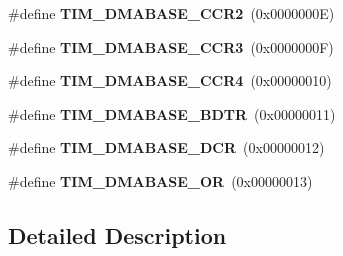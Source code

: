 \begin{DoxyCompactItemize}
\item 
\#define {\bfseries T\+I\+M\+\_\+\+D\+M\+A\+B\+A\+S\+E\+\_\+\+C\+C\+R2}~(0x0000000\+E)\hypertarget{group___t_i_m___d_m_a___base__address_ga0c73e7e1fa212ab14a43ca49e9d8850e}{}\label{group___t_i_m___d_m_a___base__address_ga0c73e7e1fa212ab14a43ca49e9d8850e}

\item 
\#define {\bfseries T\+I\+M\+\_\+\+D\+M\+A\+B\+A\+S\+E\+\_\+\+C\+C\+R3}~(0x0000000\+F)\hypertarget{group___t_i_m___d_m_a___base__address_gae3c259f405c78e31411c19195eac48bc}{}\label{group___t_i_m___d_m_a___base__address_gae3c259f405c78e31411c19195eac48bc}

\item 
\#define {\bfseries T\+I\+M\+\_\+\+D\+M\+A\+B\+A\+S\+E\+\_\+\+C\+C\+R4}~(0x00000010)\hypertarget{group___t_i_m___d_m_a___base__address_gaea24fd3f528163da065cbdce3c68ef23}{}\label{group___t_i_m___d_m_a___base__address_gaea24fd3f528163da065cbdce3c68ef23}

\item 
\#define {\bfseries T\+I\+M\+\_\+\+D\+M\+A\+B\+A\+S\+E\+\_\+\+B\+D\+TR}~(0x00000011)\hypertarget{group___t_i_m___d_m_a___base__address_ga767eab033d485d32de80b46f70be3341}{}\label{group___t_i_m___d_m_a___base__address_ga767eab033d485d32de80b46f70be3341}

\item 
\#define {\bfseries T\+I\+M\+\_\+\+D\+M\+A\+B\+A\+S\+E\+\_\+\+D\+CR}~(0x00000012)\hypertarget{group___t_i_m___d_m_a___base__address_gab3e5aaf0cb815b4a2469d3046eca0201}{}\label{group___t_i_m___d_m_a___base__address_gab3e5aaf0cb815b4a2469d3046eca0201}

\item 
\#define {\bfseries T\+I\+M\+\_\+\+D\+M\+A\+B\+A\+S\+E\+\_\+\+OR}~(0x00000013)\hypertarget{group___t_i_m___d_m_a___base__address_ga4b50ac8b63d27e309695ba36643bc1d0}{}\label{group___t_i_m___d_m_a___base__address_ga4b50ac8b63d27e309695ba36643bc1d0}

\end{DoxyCompactItemize}


\subsection{Detailed Description}
